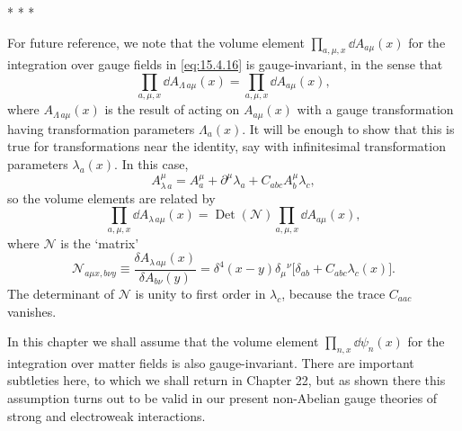 \begin{center}
  * * *
\end{center}

For future reference, we note that the volume element
$\prod_{a,\mu,x}\dd A_{a\mu}(x)$ for the integration over gauge fields
in \eqref{eq:15.4.16} is gauge-invariant, in the sense that
\begin{equation}
  \prod_{a,\mu,x}\dd A_{\Lambda\,a\mu}(x)
  =\prod_{a,\mu,x}\dd A_{a\mu}(x),
  \tag{15.4.17}\label{eq:15.4.17}
\end{equation}
where $A_{\Lambda\,a\mu}(x)$ is the result of acting on
$A_{a\mu}(x)$ with a gauge transformation having transformation
parameters $\Lambda_a(x)$. It will be enough to show that this is true for
transformations near the identity, say with infinitesimal transformation
parameters $\lambda_a(x)$. In this case,
\begin{equation*}
  A_{\lambda\,a}^\mu=A_a^\mu+\partial^\mu\lambda_a
  +C_{abc}A_b^\mu\lambda_c,
\end{equation*}
so the volume elements are related by
\begin{equation*}
  \prod_{a,\mu,x}\dd A_{\lambda\,a\mu}(x)
  =\operatorname{Det}(\mathcal N)
  \prod_{a,\mu,x}\dd A_{a\mu}(x),
\end{equation*}
where $\mathcal N$ is the `matrix'
\begin{equation*}
  \mathcal N_{a\mu x,b\nu y}
  \equiv\frac{\delta A_{\lambda\,a\mu}(x)}
  {\delta A_{b\nu}(y)}
  =\delta^4(x-y)\delta_\mu{}^\nu
  \bigl[\delta_{ab}+C_{abc}\lambda_c(x)\bigr].
\end{equation*}
The determinant of $\mathcal N$ is unity to first order in $\lambda_c$,
because the trace $C_{aac}$ vanishes.

In this chapter we shall assume that the volume element
$\prod_{n,x}\dd\psi_n(x)$ for the integration over matter fields is also
gauge-invariant. There are important subtleties here, to which we shall return
in Chapter 22, but as shown there this assumption turns out to be valid in our
present non-Abelian gauge theories of strong and electroweak interactions.
